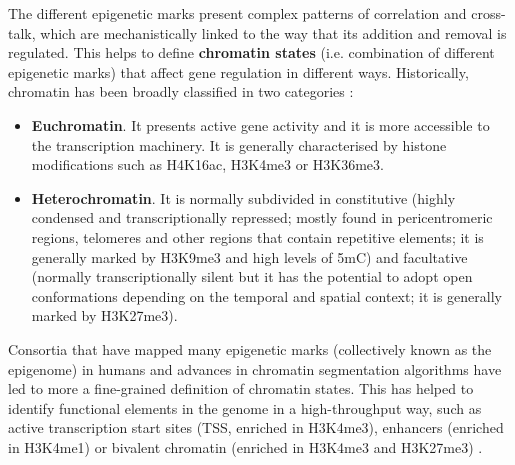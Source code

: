 The different epigenetic marks present complex patterns of correlation and cross-talk, which are mechanistically linked to the way that its addition and removal is regulated. This helps to define \textbf{chromatin states} (i.e. combination of different epigenetic marks) that affect gene regulation in different ways. Historically, chromatin has been broadly classified in two categories \cite{Allis2016,Reinberg2018,Trojer2007}:

\begin{itemize}
	
	\item \textbf{Euchromatin}. It presents active gene activity and it is more accessible to the transcription machinery. It is generally characterised by histone modifications such as H4K16ac, H3K4me3 or H3K36me3.
	
	\item \textbf{Heterochromatin}. It is normally subdivided in constitutive (highly condensed and transcriptionally repressed; mostly found in pericentromeric regions, telomeres and other regions that contain repetitive elements; it is generally marked by H3K9me3 and high levels of \acrshort{5mC}) and facultative (normally transcriptionally silent but it has the potential to adopt open conformations depending on the temporal and spatial context; it is generally marked by H3K27me3).
	
\end{itemize}

Consortia that have mapped many epigenetic marks (collectively known as the epigenome) in humans \cite{Consortium2012, Consortium2015} and advances in chromatin segmentation algorithms \cite{Ernst2010} have led to more a fine-grained definition of chromatin states. This has helped to identify functional elements in the genome in a high-throughput way, such as active transcription start sites (\acrshort{TSS}, enriched in H3K4me3), enhancers (enriched in H3K4me1) or bivalent chromatin (enriched in H3K4me3 and H3K27me3) \cite{Consortium2012, Consortium2015}. 

\bigskip

